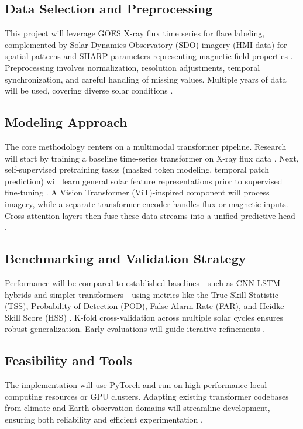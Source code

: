 \subsection{Data Selection and Preprocessing}
This project will leverage GOES X-ray flux time series for flare labeling, complemented by Solar Dynamics Observatory (SDO) imagery (HMI data) for spatial patterns and SHARP parameters representing magnetic field properties \cite{RefWorks:RefID:2-abduallah2023operational, RefWorks:RefID:12-zheng2023comparative}. Preprocessing involves normalization, resolution adjustments, temporal synchronization, and careful handling of missing values. Multiple years of data will be used, covering diverse solar conditions \cite{RefWorks:RefID:13-yıldız2023effect}.

\subsection{Modeling Approach}
The core methodology centers on a multimodal transformer pipeline. Research will start by training a baseline time-series transformer on X-ray flux data \cite{RefWorks:RefID:3-vaswani2023provided}. Next, self-supervised pretraining tasks (masked token modeling, temporal patch prediction) will learn general solar feature representations prior to supervised fine-tuning \cite{RefWorks:RefID:21-fedus2022switch, RefWorks:RefID:29-hoffmanntraining}. A Vision Transformer (ViT)-inspired component will process imagery, while a separate transformer encoder handles flux or magnetic inputs. Cross-attention layers then fuse these data streams into a unified predictive head \cite{RefWorks:RefID:2-abduallah2023operational}.

\subsection{Benchmarking and Validation Strategy}
Performance will be compared to established baselines—such as CNN-LSTM hybrids and simpler transformers—using metrics like the True Skill Statistic (TSS), Probability of Detection (POD), False Alarm Rate (FAR), and Heidke Skill Score (HSS) \cite{RefWorks:RefID:12-zheng2023comparative}. K-fold cross-validation across multiple solar cycles ensures robust generalization. Early evaluations will guide iterative refinements \cite{RefWorks:RefID:13-yıldız2023effect}.

\subsection{Feasibility and Tools}
The implementation will use PyTorch and run on high-performance local computing resources or GPU clusters. Adapting existing transformer codebases from climate and Earth observation domains will streamline development, ensuring both reliability and efficient experimentation \cite{RefWorks:RefID:3-vaswani2023provided, RefWorks:RefID:1-gettelman1997future, RefWorks:RefID:30-schmude2024prithvi}.